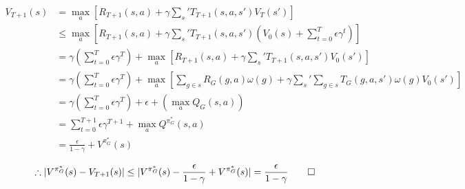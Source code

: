 \documentclass[11pt]{amsart}
\begin{document}
\begin{align*}
V_{T+1}(s) &= \max_a \left[R_{T+1}(s,a) + \gamma \sum_s' T_{T+1}(s,a,s')V_T(s')\right] \\
&\leq \max_a \left[R_{T+1}(s,a) + \gamma \sum_s' T_{T+1}(s,a,s')\left(V_0(s) + \sum_{t=0}^T\epsilon\gamma^t \right) \right] \\
&= \gamma\left(\sum_{t=0}^T\epsilon\gamma^T\right) + \max_a \left[R_{T+1}(s,a) + \gamma \sum_s' T_{T+1}(s,a,s')V_0(s') \right] \\
&= \gamma\left(\sum_{t=0}^T\epsilon\gamma^T\right) + \max_a \left[\sum_{g \in s} R_{G}(g,a)\omega(g) + \gamma \sum_s' \sum_{g \in s}T_G(g,a,s')\omega(g)V_0(s') \right] \\
&= \gamma\left(\sum_{t=0}^T\epsilon\gamma^T\right) + \epsilon + \left(\max_a Q_G(s,a)\right) \\
&= \sum_{t=0}^{T+1} \epsilon \gamma^{T+1} + \max_a Q^{\pi_G^*}(s,a) \\
&= \frac{\epsilon}{1-\gamma} + V^{\pi_G^*}(s) \\
\end{align*}
\begin{equation}
\therefore |V^{\pi_G^*}(s) - V_{T+1}(s)| \leq | V^{\pi_G^*}(s) - \frac{\epsilon}{1-\gamma} + V^{\pi_G^*}(s)| = \frac{\epsilon}{1-\gamma} \qed
\end{equation}

%
%
%

\newpage
\end{document}
